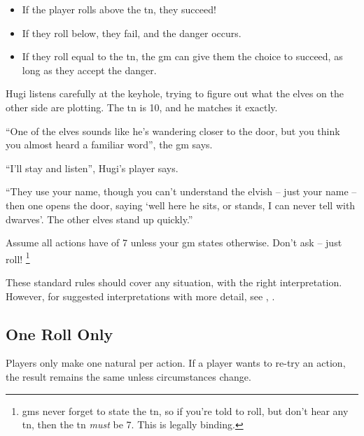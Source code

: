 \begin{multicols}{2}
\begin{multicols}{2}
\begin{itemize}

  \item
  If the player rolls above the \gls{tn}, they succeed!
  \item
  If they roll below, they fail, and the danger occurs.
  \item
  If they roll equal to the \gls{tn}, the \gls{gm} can give them the choice to succeed, as long as they accept the danger.

\end{itemize}

\columnbreak

\noindent
\TNChart

\end{multicols}

\begin{exampletext}
  Hugi listens carefully at the keyhole, trying to figure out what the elves on the other side are plotting.
  The \gls{tn} is 10, and he matches it exactly.

  ``One of the elves sounds like he's wandering closer to the door, but you think you almost heard a familiar word'', the \gls{gm} says.

  ``I'll stay and listen'', Hugi's player says.

  ``They use your name, though you can't understand the elvish -- just your name -- then one opens the door, saying `well here he sits, or stands, I can never tell with dwarves'.
  The other elves stand up quickly.''

\end{exampletext}

Assume all actions have  of 7 unless your \gls{gm} states otherwise.
Don't ask -- just roll!%
\footnote{\Glspl{gm} never forget to state the \gls{tn}, so if you're told to roll, but don't hear any \gls{tn}, then the \gls{tn} \emph{must} be 7.
This is legally binding.}

These standard rules should cover any situation, with the right interpretation.
However, for suggested interpretations with more detail, see , .

\subsection{One Roll Only}

Players only make one \gls{natural} per action.
If a player wants to re-try an action, the result remains the same unless circumstances change.


\end{multicols}
